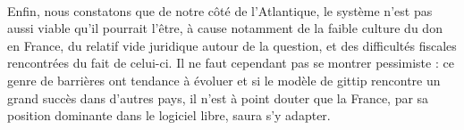 \paragraph{}
Enfin, nous constatons que de notre côté de l'Atlantique, le système n'est pas 
aussi viable qu'il pourrait l'être, à cause notamment de la faible culture du 
don en France, du relatif vide juridique autour de la question, et des 
difficultés fiscales rencontrées du fait de celui-ci. Il ne faut cependant pas 
se montrer pessimiste : ce genre de barrières ont tendance à évoluer et si le 
modèle de gittip rencontre un grand succès dans d'autres pays, il n'est à 
point douter que la France, par sa position dominante dans le logiciel libre, 
saura s'y adapter.

